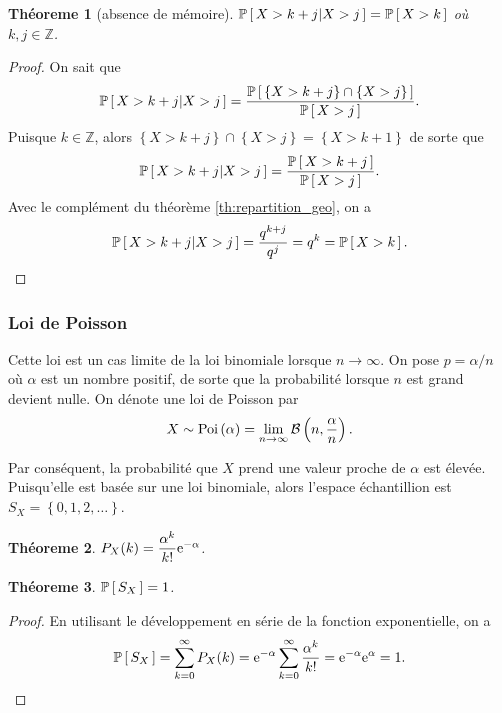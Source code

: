 \documentclass[11pt]{article}
\renewcommand\P[1]{%
	\ensuremath{%
		\mathbb{P}\left[\,#1\,\right]%
	}%
}%
\newcommand\Pg[2]{%
	\ensuremath{%
		\mathbb{P}\left[\,#1\middle\rvert#2\,\right]%
	}%
}%
\newcommand\e{%
	\ensuremath{%
		\mathrm{e}%
	}%
}%
\newcommand\Bin[2]{%
	\ensuremath{%
		\mathcal{B}\left(#1,#2\right)%
	}%
}%
\newcommand\Poi[1]{%
	\ensuremath{%
		\mathrm{Poi}\left(#1\right)%
	}%
}%
\newtheorem{theoreme}{Théoreme}[section]
\begin{document}
\begin{theoreme}[absence de mémoire]
	$\Pg{X>k+j}{X>j}=\P{X>k}$ où $k,j\in\mathbb{Z}$.
\end{theoreme}

\begin{proof}
	On sait que
	\begin{equation*}
		\Pg{X>k+j}{X>j}=\frac{\P{
			\left\{X>k+j\right\}\cap
	   		\left\{X>j\right\}}}{\P{X>j}}.
	\end{equation*}
	Puisque $k\in\mathbb{Z}$, alors $\left\{X>k+j\right\}\cap\left\{X>j\right\}
	=\left\{X>k+1\right\}$ de sorte que
	\begin{equation*}
		\Pg{X>k+j}{X>j}=\frac{\P{X>k+j}}{\P{X>j}}.
	\end{equation*}
	Avec le complément du théorème \ref{th:repartition_geo}, on a
	\begin{equation*}
		\Pg{X>k+j}{X>j}=\frac{q^{k+j}}{q^{j}}=q^{k}=\P{X>k}.\qedhere
	\end{equation*}
\end{proof}

\subsubsection{Loi de Poisson}
Cette loi est un cas limite de la loi binomiale lorsque $n\rightarrow\infty$.
On pose $p=\alpha/n$ où $\alpha$ est un nombre positif, de sorte que la 
probabilité lorsque $n$ est grand devient nulle. On dénote une loi de Poisson
par
\begin{equation*}
	X\sim\Poi{\alpha}
	=\lim_{n\rightarrow\infty}\Bin{n}{\frac{\alpha}{n}}.
\end{equation*}

Par conséquent, la probabilité que $X$ prend une valeur proche de $\alpha$ est
élevée. Puisqu'elle est basée sur une loi binomiale, alors l'espace
échantillion est $S_X=\left\{0,1,2,\dots\right\}$.

\begin{theoreme}
	$P_X(k)=\dfrac{\alpha^k}{k!}\e^{-\alpha}$.
\end{theoreme}

\begin{theoreme}
	$\P{S_X}=1$.
\end{theoreme}

\begin{proof}
	En utilisant le développement en série de la fonction exponentielle, on a
	\begin{equation*}
		\P{S_X}
		=\sum_{k=0}^\infty P_X(k)
		=\e^{-\alpha}\sum_{k=0}^\infty\frac{\alpha^k}{k!}
		=\e^{-\alpha}\e^\alpha
		=1.\qedhere
	\end{equation*}
\end{proof}
\end{document}
